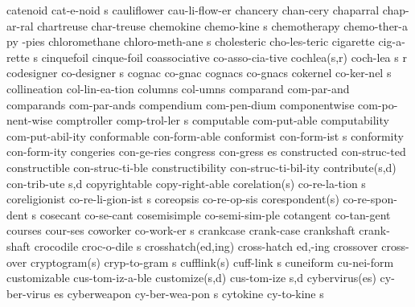 \5 catenoid		cat-e-noid s		%
\1 cauliflower		cau-li-flow-er
\1 chancery		chan-cery		%
\1 chaparral		chap-ar-ral
\1 chartreuse		char-treuse
\NewWordtrue
\5 chemokine		chemo-kine s		%
\6 chemotherapy 	chemo-ther-a py -pies   %
\5 chloromethane	chloro-meth-ane s	%
\1 cholesteric		cho-les-teric
\5 cigarette		cig-a-rette s
\1 cinquefoil		cinque-foil
\1 coassociative	co-asso-cia-tive	%
\3 cochlea(s,r)		coch-lea s r		%
\5 codesigner		co-designer s		%
\1 cognac		co-gnac
\1 cognacs		co-gnacs
\5 cokernel		co-ker-nel s		%
\1 collineation 	col-lin-ea-tion		%
\1 columns              col-umns             %
\1 comparand		com-par-and
\1 comparands		com-par-ands
\1 compendium		com-pen-dium         %
\1 componentwise	com-po-nent-wise     %
\5 comptroller		comp-trol-ler s
\1 computable		com-put-able		%
\1 computability	com-put-abil-ity	%
\1 conformable		con-form-able
\5 conformist		con-form-ist s
\1 conformity		con-form-ity
\1 congeries		con-ge-ries		%
\5 congress		con-gress es
\NewWordtrue
\1 constructed		con-struc-ted		%
\1 constructible	con-struc-ti-ble	%
\1 constructibility	con-struc-ti-bil-ity	%
\2 contribute(s,d)	con-trib-ute s,d
\1 copyrightable	copy-right-able		%
\2 corelation(s)	co-re-la-tion s		%
\5 coreligionist	co-re-li-gion-ist s	%
\1 coreopsis		co-re-op-sis		%
\2 corespondent(s)	co-re-spon-dent s	%
\1 cosecant		co-se-cant
\1 cosemisimple		co-semi-sim-ple		%
\1 cotangent		co-tan-gent
\1 courses		cour-ses
\5 coworker		co-work-er s		%
\1 crankcase		crank-case		%
\1 crankshaft		crank-shaft
\5 crocodile		croc-o-dile s
\2 crosshatch(ed,ing)	cross-hatch ed,-ing
\1 crossover		cross-over		%
\2 cryptogram(s)	cryp-to-gram s		%
\2 cufflink(s)		cuff-link s		%
\1 cuneiform		cu-nei-form		%
\1 customizable		cus-tom-iz-a-ble	%
\2 customize(s,d)	cus-tom-ize s,d		%
\2 cybervirus(es)	cy-ber-virus es		%
\5 cyberweapon		cy-ber-wea-pon s	%
\NewWordtrue
\5 cytokine		cy-to-kine s		%
